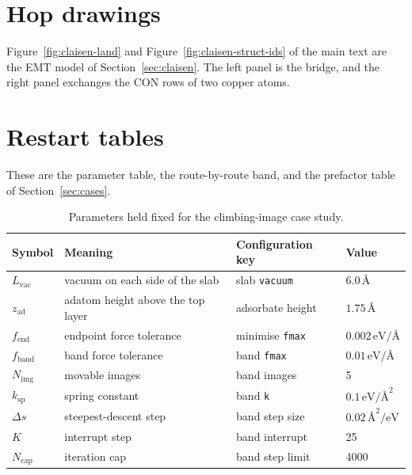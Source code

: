 \section{Hop drawings}\label{sec:supp-claisen-draw}
Figure~\ref{fig:claisen-land} and Figure~\ref{fig:claisen-struct-ids} of the main text are the EMT model of Section~\ref{sec:claisen}.
The left panel is the bridge, and the right panel exchanges the CON rows of two copper atoms.


\section{Restart tables}\label{sec:supp-restart-tables}
These are the parameter table, the route-by-route band, and the prefactor table of Section~\ref{sec:cases}.
\begin{table}[tbp] \centering \small
\caption{Parameters held fixed for the climbing-image case study.}
\label{tab:params}
\begin{tabular}{@{}llll@{}}
\toprule
Symbol & Meaning & Configuration key & Value \\
\midrule
\(L_{\mathrm{vac}}\) & vacuum on each side of the slab & slab \texttt{vacuum} & \(6.0\,\text{\AA}\) \\
\(z_{\mathrm{ad}}\) & adatom height above the top layer & adsorbate height & \(1.75\,\text{\AA}\) \\
\(f_{\mathrm{end}}\) & endpoint force tolerance & minimise \texttt{fmax} & \(0.002\,\mathrm{eV/\text{\AA}}\) \\
\(f_{\mathrm{band}}\) & band force tolerance & band \texttt{fmax} & \(0.01\,\mathrm{eV/\text{\AA}}\) \\
\(N_{\mathrm{img}}\) & movable images & band images & 5 \\
\(k_{\mathrm{sp}}\) & spring constant & band \texttt{k} & \(0.1\,\mathrm{eV/\text{\AA}^2}\) \\
\(\Delta s\) & steepest-descent step & band step size & \(0.02\,\text{\AA}^2/\mathrm{eV}\) \\
\(K\) & interrupt step & band interrupt & 25 \\
\(N_{\mathrm{cap}}\) & iteration cap & band step limit & 4000 \\
\bottomrule
\end{tabular}
\end{table}






